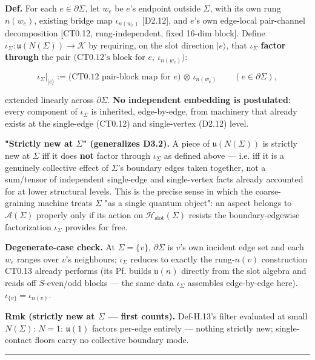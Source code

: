 \begin{definition}\label{tag:Def-H-13}
\textbf{Def.} For each $e\in\partial\Sigma$, let $w_e$ be $e$'s endpoint outside $\Sigma$, with its own rung $n(w_e)$, existing bridge map $\iota_{n(w_e)}$ [D2.12], and $e$'s own edge-local pair-channel decomposition [CT0.12, rung-independent, fixed 16-dim block]. Define $\iota_\Sigma:\mathfrak u(N(\Sigma))\to\mathcal K$ by requiring, on the slot direction $|e\rangle$, that $\iota_\Sigma$ \textbf{factor through} the pair $\bigl(\text{CT0.12's block for }e,\ \iota_{n(w_e)}\bigr)$:

\[
\iota_\Sigma\big|_{|e\rangle}:=\bigl(\text{CT0.12 pair-block map for }e\bigr)\,\otimes\,\iota_{n(w_e)}\qquad(e\in\partial\Sigma),
\]

extended linearly across $\partial\Sigma$. \textbf{No independent embedding is postulated}: every component of $\iota_\Sigma$ is inherited, edge-by-edge, from machinery that already exists at the single-edge (CT0.12) and single-vertex (D2.12) level.

\textbf{"Strictly new at $\Sigma$" (generalizes D3.2).} A piece of $\mathfrak u(N(\Sigma))$ is strictly new at $\Sigma$ iff it does \textbf{not} factor through $\iota_\Sigma$ as defined above — i.e. iff it is a genuinely collective effect of $\Sigma$'s boundary edges taken together, not a sum/tensor of independent single-edge and single-vertex facts already accounted for at lower structural levels. This is the precise sense in which the coarse-graining machine treats $\Sigma$ "as a single quantum object": an aspect belongs to $\mathcal A(\Sigma)$ properly only if its action on $\mathcal H_{\mathrm{slot}}(\Sigma)$ resists the boundary-edgewise factorization $\iota_\Sigma$ provides for free.

\textbf{Degenerate-case check.} At $\Sigma=\{v\}$, $\partial\Sigma$ is $v$'s own incident edge set and each $w_e$ ranges over $v$'s neighbours; $\iota_\Sigma$ reduces to exactly the rung-$n(v)$ construction CT0.13 already performs (its Pf. builds $\mathfrak u(n)$ directly from the slot algebra and reads off $S$-even/odd blocks — the same data $\iota_\Sigma$ assembles edge-by-edge here). $\iota_{\{v\}}=\iota_{n(v)}$.

\textbf{Rmk (strictly new at $\Sigma$ — first counts).} Def-H.13's filter evaluated at small $N(\Sigma)$: $N=1$: $\mathfrak u(1)$ factors per-edge entirely — nothing strictly new; single-contact floors carry no collective boundary mode.

\vspace{2pt}\noindent\rule{\textwidth}{0.4pt}\vspace{2pt}

\end{definition}

